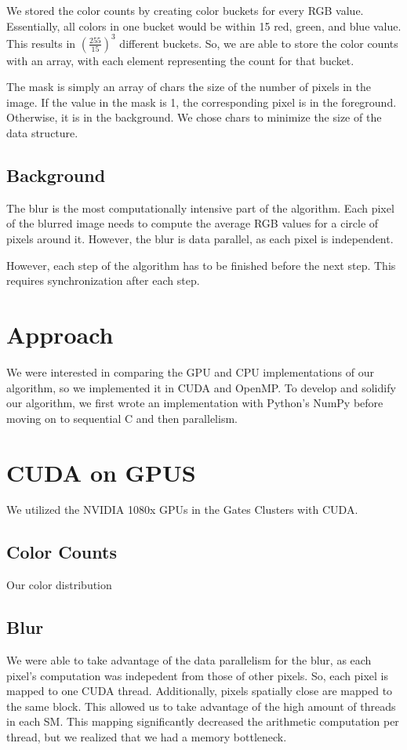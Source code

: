 \documentclass[12pt]{article}
\begin{document}
We stored the color counts by creating color buckets for every RGB value.
Essentially, all colors in one bucket would be within 15 red, green, and blue
value. This results in $\left(\tfrac{255}{15}\right)^3$ different buckets.
So, we are able to store the color counts with an array, with each element
representing the count for that bucket.

The mask is simply an array of chars the size of the number of pixels in the
image. If the value in the mask is 1, the corresponding pixel is in the
foreground. Otherwise, it is in the background. We chose chars to minimize the
size of the data structure.

\subsection{Background}
The blur is the most computationally intensive part of the algorithm. Each pixel
of the blurred image needs to compute the average RGB values for a circle
of pixels around it. However, the blur is data parallel, as each pixel is
independent.

However, each step of the algorithm has to be finished before the next step.
This requires synchronization after each step.

\section{Approach}
We were interested in comparing the GPU and CPU implementations of
our algorithm, so we implemented it in CUDA and OpenMP.
To develop and solidify our algorithm, we first wrote an implementation with
Python's NumPy before moving on to sequential C and then parallelism.

\section{CUDA on GPUS}
We utilized the NVIDIA 1080x GPUs in the Gates Clusters with CUDA.

\subsection{Color Counts}
Our color distribution

\subsection{Blur}
We were able to take advantage of the data parallelism for the blur, as each
pixel's computation was indepedent from those of other pixels. So, each pixel
is mapped to one CUDA thread. Additionally, pixels spatially close are mapped to
the same block. This allowed us to take advantage of the high
amount of threads in each SM. This mapping significantly decreased the
arithmetic computation per thread, but we realized that we had a memory
bottleneck.
\end{document}
